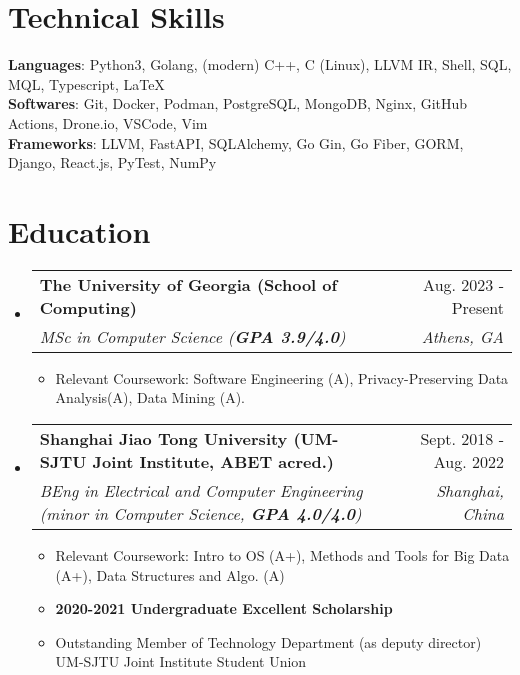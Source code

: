 \documentclass[letterpaper,11pt]{article}
\makeatletter
\newcommand{\resumeItem}[1]{
  \item\small{
    {#1 \vspace{-2pt}}
  }
}
\newcommand{\resumeSubHeader}[4]{
  \vspace{-2pt}\item
    \begin{tabular*}{0.98\textwidth}[t]{l@{\extracolsep{\fill}}r}
      \textbf{#1} & #2 \\
      \textit{\small#3} & \textit{\small #4} \\
    \end{tabular*}\vspace{-7pt}
}
\newcommand{\resumeSubHeaderListStart}{\begin{itemize}[leftmargin=0.15in, label={}]}
\newcommand{\resumeSubHeaderListEnd}{\end{itemize}}
\newcommand{\resumeItemListStart}{\begin{itemize}}
\newcommand{\resumeItemListEnd}{\end{itemize}\vspace{-5pt}}
\makeatother
\begin{document}
\section{Technical Skills}
 \begin{itemize}[leftmargin=0.15in, label={}]
  \setlength\itemsep{0em}
    \small{
      \setlength\itemsep{0em}
      \item{
     \textbf{Languages}{: Python3, Golang, (modern) C++, C (Linux), LLVM IR, Shell, SQL, MQL, Typescript, \LaTeX} \\
     \textbf{Softwares}{: Git, Docker, Podman, PostgreSQL, MongoDB, Nginx, GitHub Actions, Drone.io, VSCode, Vim} \\
     \textbf{Frameworks}{: LLVM, FastAPI, SQLAlchemy, Go Gin, Go Fiber, GORM, Django, React.js, PyTest, NumPy} \\
    }}
 \end{itemize}

\section{Education}
  \resumeSubHeaderListStart
    \resumeSubHeader
      {The University of Georgia (School of Computing)}{Aug. 2023 - Present}
      {MSc in Computer Science (\textbf{GPA 3.9/4.0})}{Athens, GA}
      \resumeItemListStart
        \resumeItem{Relevant Coursework: Software Engineering (A), Privacy-Preserving Data Analysis(A), Data Mining (A).}
      \resumeItemListEnd
    \resumeSubHeader
      {Shanghai Jiao Tong University (UM-SJTU Joint Institute, ABET acred.)}{Sept. 2018 - Aug. 2022}
      {BEng in Electrical and Computer Engineering (minor in Computer Science, \textbf{GPA 4.0/4.0})}{Shanghai, China}
      \resumeItemListStart
        \resumeItem{Relevant Coursework: Intro to OS (A+), Methods and Tools for Big Data (A+), Data Structures and Algo. (A)}
        \resumeItem{\textbf{2020-2021 Undergraduate Excellent Scholarship}}
        \resumeItem{Outstanding Member of Technology Department (as deputy director) UM-SJTU Joint Institute Student Union}
      \resumeItemListEnd
  \resumeSubHeaderListEnd

\end{document}
